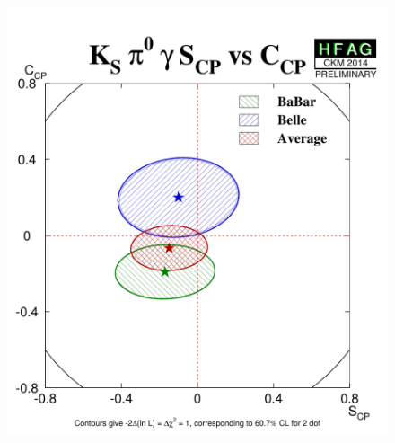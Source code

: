 \begin{figure}[htb]
\begin{center}
{      \includegraphics{figures/cp_uta/KSpi0gammaS_CPvsC_CP}
    } \\
\end{center}
\end{figure}
